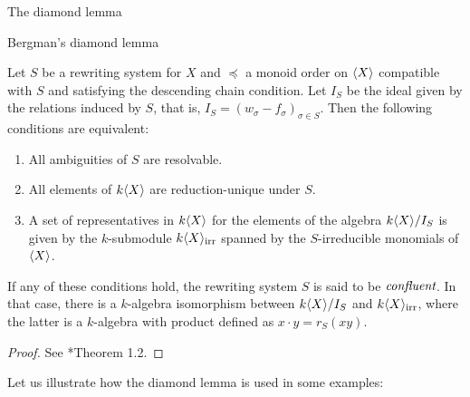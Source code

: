 \begin{chapter}{The diamond lemma}
\begin{section}{Bergman's diamond lemma}
\begin{thm} Let $S$ be a rewriting system for $X$ and $\preceq$ a monoid order on $\langle X\rangle$ compatible with $S$ and satisfying the descending chain condition. Let $I_S$ be the ideal given by the relations induced by $S$, that is, $I_S=(w_\sigma-f_\sigma)_{\sigma\in S}$. Then the following conditions are equivalent:
\begin{enumerate}
\item All ambiguities of $S$ are resolvable.
\item All elements of $k\langle X\rangle$ are reduction-unique under $S$.
\item A set of representatives in $k\langle X\rangle$ for the elements of the algebra $k\langle X\rangle/I_S$ is given by the $k$-submodule $k\langle X\rangle_{\mathrm{irr}}$ spanned by the $S$-irreducible monomials of $\langle X\rangle$.
\end{enumerate}
If any of these conditions hold, the rewriting system $S$ is said to be $\emph{confluent}$. In that case, there is a $k$-algebra isomorphism between $k\langle X\rangle/I_S$ and $k\langle X\rangle_{\mathrm{irr}}$, where the latter is a $k$-algebra with product defined as $x\cdot y= r_S(xy)$.
\end{thm}
\begin{proof} See {\cite{Ber78}*{Theorem 1.2}}.
\end{proof}

Let us illustrate how the diamond lemma is used in some examples:


\end{section}
\end{chapter}
